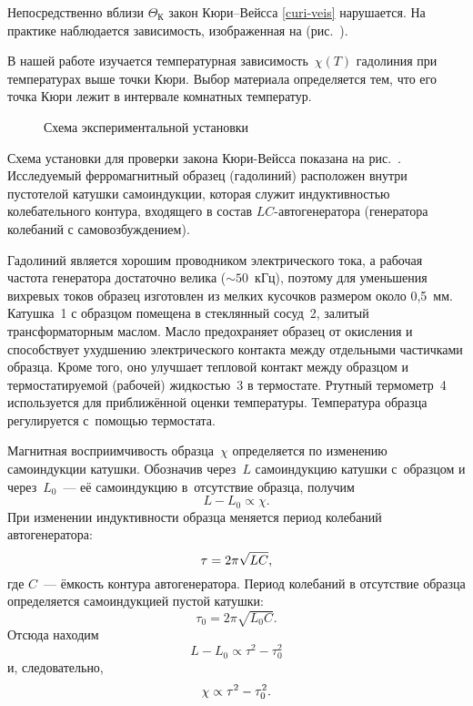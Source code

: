 
Непосредственно вблизи $\Theta_К$ закон Кюри--Вейсса
\eqref{curi-veis} нарушается. На практике наблюдается зависимость, изображенная
на (рис.~).

\experiment

В нашей работе изучается температурная зависимость~$\chi(T)$ гадолиния при
температурах выше точки Кюри. Выбор материала определяется тем, что его точка
Кюри лежит в интервале комнатных температур.

\begin{figure}[h]
    \caption{Схема экспериментальной установки}
\end{figure}


Схема установки для проверки закона Кюри-Вейсса показана на рис.~.
Исследуемый ферромагнитный образец (гадолиний) расположен внутри пустотелой
катушки самоиндукции, которая служит индуктивностью колебательного контура,
входящего в состав $LC$-авто\-генератора (генератора колебаний с
самовозбуждением).



Гадолиний является хорошим проводником электрического тока, а рабочая частота
генератора достаточно велика (${\sim}50$~кГц), поэтому для уменьшения вихревых
токов образец изготовлен из мелких кусочков размером около 0,5~мм.
Катушка~1 с образцом помещена в стеклянный сосуд~2, залитый трансформаторным
маслом. Масло предохраняет образец от окисления и способствует ухудшению
электрического контакта между отдельными частичками образца. Кроме того, оно
улучшает тепловой контакт между образцом и термостатируемой (рабочей)
жидкостью~3 в термостате. Ртутный термометр~4 используется для приближённой
оценки температуры. Температура образца регулируется с~помощью термостата.

Магнитная восприимчивость образца~$\chi$ определяется по изменению самоиндукции
катушки. Обозначив через~$L$ самоиндукцию катушки с~образцом и через~$L_0$~---
её самоиндукцию в~отсутствие образца, получим
\begin{equation*}%
	L-L_0\propto \chi.
\end{equation*}
При изменении индуктивности образца меняется период колебаний автогенератора:
\begin{equation*}%
	\tau=2\pi\sqrt{LC},
	\eqmark{4}
\end{equation*}
где $C$~--- ёмкость контура автогенератора.
Период колебаний в отсутствие образца определяется самоиндукцией пустой катушки:
\[\tau_0=2\pi\sqrt{L_0 C}.\]
Отсюда находим
\begin{equation*}
	L-L_0 \propto \tau^2-\tau_0^2
\end{equation*}
и, следовательно,
\begin{equation}%
	\eqmark{6}
	\chi\propto \tau^2-\tau_0^2.
\end{equation}

